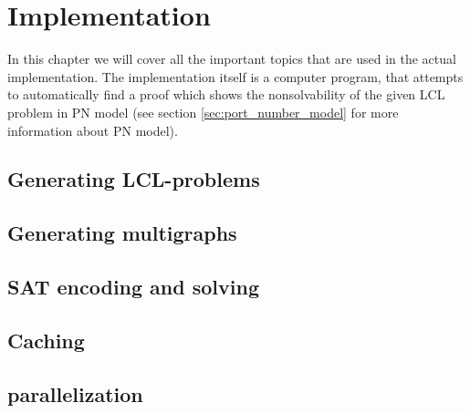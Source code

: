 
\section{Implementation} \label{sec:implementation}
In this chapter we will cover all the important topics that are used in the actual implementation.
The implementation itself is a computer program, that attempts to automatically find a proof which shows the nonsolvability of the given LCL problem in PN model (see section \ref{sec:port_number_model} for more information about PN model).





\subsection{Generating LCL-problems}
\subsection{Generating multigraphs}

\subsection{SAT encoding and solving}
\subsection{Caching}

\subsection{parallelization}

